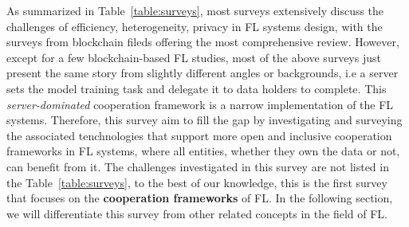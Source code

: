 As summarized in Table~\ref{table:surveys}, most surveys extensively discuss the challenges of efficiency, heterogeneity, privacy in FL systems design, with the surveys from blockchain fileds offering the most comprehensive review.
However, except for a few blockchain-based FL studies, most of the above surveys just present the same story from slightly different angles or backgrounds, i.e a server sets the model training task and delegate it to data holders to complete. 
This \textit{server-dominated} cooperation framework is a narrow implementation of the FL systems.
Therefore, this survey aim to fill the gap by investigating and surveying the associated tenchnologies that support more open and inclusive cooperation frameworks in FL systems, where all entities, whether they own the data or not, can benefit from it. 
The challenges investigated in this survey are not listed in the Table~\ref{table:surveys}, to the best of our knowledge, this is the first survey that focuses on the \textbf{cooperation frameworks} of FL.
In the following section, we will differentiate this survey from other related concepts in the field of FL.

